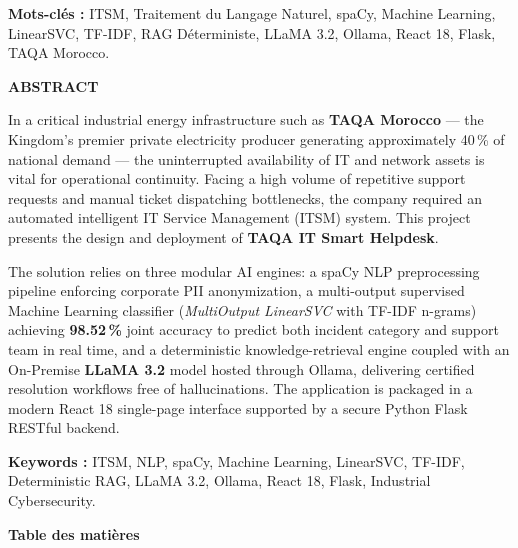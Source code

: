 \documentclass[12pt, a4paper, oneside]{report}
\begin{document}
\vspace{0.4cm}
\noindent\textbf{Mots-clés :} ITSM, Traitement du Langage Naturel, spaCy, Machine Learning, LinearSVC, TF-IDF, RAG Déterministe, LLaMA 3.2, Ollama, React 18, Flask, TAQA Morocco.

\vspace{1.0cm}

\begin{flushright}
  \textbf{\Large ABSTRACT}
\end{flushright}

\vspace{0.6cm}

In a critical industrial energy infrastructure such as \textbf{TAQA Morocco} --- the Kingdom's premier private electricity producer generating approximately 40\,\% of national demand --- the uninterrupted availability of IT and network assets is vital for operational continuity. Facing a high volume of repetitive support requests and manual ticket dispatching bottlenecks, the company required an automated intelligent IT Service Management (ITSM) system. This project presents the design and deployment of \textbf{TAQA IT Smart Helpdesk}.

The solution relies on three modular AI engines: a spaCy NLP preprocessing pipeline enforcing corporate PII anonymization, a multi-output supervised Machine Learning classifier (\textit{MultiOutput LinearSVC} with TF-IDF n-grams) achieving \textbf{98.52\,\%} joint accuracy to predict both incident category and support team in real time, and a deterministic knowledge-retrieval engine coupled with an On-Premise \textbf{LLaMA 3.2} model hosted through Ollama, delivering certified resolution workflows free of hallucinations. The application is packaged in a modern React 18 single-page interface supported by a secure Python Flask RESTful backend.

\vspace{0.4cm}
\noindent\textbf{Keywords :} ITSM, NLP, spaCy, Machine Learning, LinearSVC, TF-IDF, Deterministic RAG, LLaMA 3.2, Ollama, React 18, Flask, Industrial Cybersecurity.

\newpage
{}
\begin{flushright}
  \textbf{\Large Table des matières}
\end{flushright}

\vspace{0.6cm}

\tableofcontents
\end{document}

